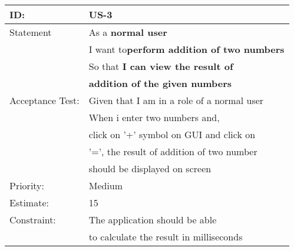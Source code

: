 \documentclass[12pt,a4paper]{article}
\begin{document}
\begin{table}[h]
\centering
\begin{tabular}{|l|l|}
\hline
ID: & US-3 \\
\hline
Statement & As a \textbf{normal user} \\& I want to\textbf{perform addition of two numbers }  \\ &So that \textbf{I can view the result of }\\& \textbf{addition of the given numbers }\\
\hline
Acceptance Test: & Given that I am in a role of a normal user\\
& When i enter two numbers and,\\& click on '+' symbol on GUI and click on \\
& '=', the result of addition of two number \\& should be displayed on screen\\
\hline
Priority: & Medium \\
\hline
Estimate: & 15\\
\hline
Constraint: & The application should be able  \\& to calculate the result in milliseconds\\
\hline
\end{tabular}
\end{table}
\end{document}
